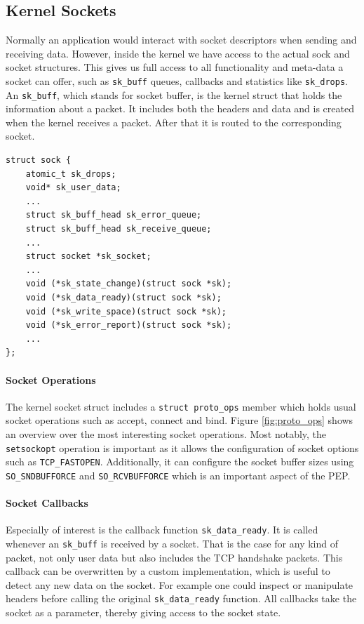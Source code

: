 \documentclass[a4paper,english, 11pt]{report}
\begin{document}
\subsection{Kernel Sockets}
Normally an application would interact with socket descriptors when sending and receiving data. However, inside the kernel we have access to the actual sock and socket structures. This gives us full access to all functionality and meta-data a socket can offer, such as \verb|sk_buff| queues, callbacks and statistics like \verb|sk_drops|. An \verb|sk_buff|, which stands for socket buffer, is the kernel struct that holds the information about a packet. It includes both the headers and data and is created when the kernel receives a packet. After that it is routed to the corresponding socket.\\

\noindent\begin{minipage}{\linewidth}
\begin{verbatim}
struct sock {
    atomic_t sk_drops;
    void* sk_user_data;
    ...
    struct sk_buff_head	sk_error_queue;
    struct sk_buff_head	sk_receive_queue;
    ...
    struct socket *sk_socket;
    ...
    void (*sk_state_change)(struct sock *sk);
    void (*sk_data_ready)(struct sock *sk);
    void (*sk_write_space)(struct sock *sk);
    void (*sk_error_report)(struct sock *sk);
    ...
};
\end{verbatim}
\label{fig:kern_sock}
\end{minipage}

\paragraph{Socket Operations}
The kernel socket struct includes a \verb|struct proto_ops| member which holds usual socket operations such as accept, connect and bind.
Figure \ref{fig:proto_ops} shows an overview over the most interesting socket operations. Most notably, the \verb|setsockopt| operation is important as it allows the configuration of socket options such as \verb|TCP_FASTOPEN|. Additionally, it can configure the socket buffer sizes using \verb|SO_SNDBUFFORCE| and \verb|SO_RCVBUFFORCE| which is an important aspect of the PEP.

\paragraph{Socket Callbacks}
Especially of interest is the callback function \verb|sk_data_ready|. It is called whenever an \verb|sk_buff| is received by a socket. That is the case for any kind of packet, not only user data but also includes the TCP handshake packets. This callback can be overwritten by a custom implementation, which is useful to detect any new data on the socket. For example one could inspect or manipulate headers before calling the original \verb|sk_data_ready| function. All callbacks take the socket as a parameter, thereby giving access to the socket state. \\
\end{document}
